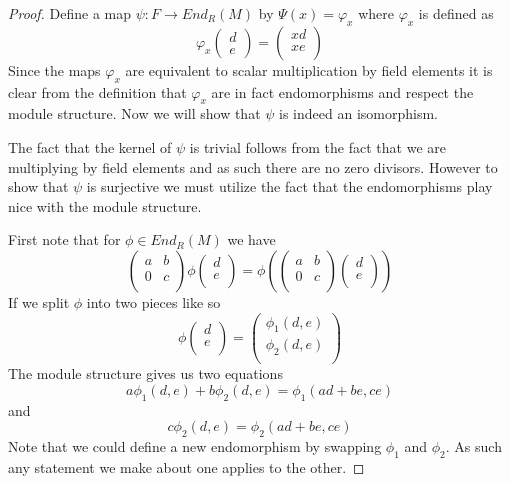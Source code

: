 \documentclass[10pt]{article}
\theoremstyle{plain}
\theoremstyle{remark}
\begin{document}
\begin{proof}
  Define a map $\psi:F\rightarrow End_R(M)$ by $\Psi(x)=\varphi_x$ where $\varphi_x$
  is defined as
  \[
    \varphi_x\left(
      \begin{array}{c}
        d\\
        e
      \end{array}
    \right)
    =
    \left(
      \begin{array}{c}
        xd\\
        xe\\
      \end{array}
    \right)
  \]
  Since the maps $\varphi_x$ are equivalent to scalar multiplication by
  field elements it is clear from the definition that $\varphi_x$ are in
  fact endomorphisms and respect the module structure. Now we
  will show that $\psi$ is indeed an isomorphism.

  The fact that the kernel of $\psi$ is trivial follows from the fact
  that we are multiplying by field elements and as such there are
  no zero divisors. However to show that $\psi$ is surjective we
  must utilize the fact that the endomorphisms play nice with
  the module structure.

  First note that for $\phi\in End_R(M)$ we have
  \[
    \left(
      \begin{array}{cc}
        a&b\\
        0&c\\
      \end{array}
    \right)
    \phi
    \left(
      \begin{array}{c}
        d\\
        e\\
      \end{array}
    \right)
    =
    \phi
    \left(
      \left(
        \begin{array}{cc}
          a&b\\
          0&c\\
        \end{array}
      \right)
      \left(
        \begin{array}{c}
          d\\
          e\\
        \end{array}
      \right)
    \right)
  \]
  If we split $\phi$ into two pieces like so
  \[
    \phi\left(
      \begin{array}{c}
        d\\
        e\\
      \end{array}
    \right)
    =
    \left(
      \begin{array}{c}
        \phi_1(d,e)\\
        \phi_2(d,e)\\
      \end{array}
    \right)
  \]
  The module structure gives us two equations
  \[
    a\phi_1(d,e)+b\phi_2(d,e)=\phi_1(ad+be,ce)
  \]
  and
  \[
    c\phi_2(d,e)=\phi_2(ad+be,ce)
  \]
  Note that we could define a new endomorphism by swapping $\phi_1$ and
  $\phi_2$. As such any statement we make about one applies to the other.


\end{proof}
\end{document}
